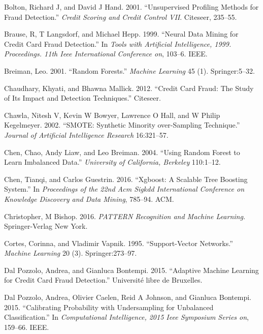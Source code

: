 \documentclass[12pt,]{article}
\begin{document}
\leavevmode\hypertarget{ref-bolton2001unsupervised}{}%
Bolton, Richard J, and David J Hand. 2001. ``Unsupervised Profiling
Methods for Fraud Detection.'' \emph{Credit Scoring and Credit Control
VII}. Citeseer, 235--55.

\leavevmode\hypertarget{ref-brause1999neural}{}%
Brause, R, T Langsdorf, and Michael Hepp. 1999. ``Neural Data Mining for
Credit Card Fraud Detection.'' In \emph{Tools with Artificial
Intelligence, 1999. Proceedings. 11th Ieee International Conference on},
103--6. IEEE.

\leavevmode\hypertarget{ref-breiman2001random}{}%
Breiman, Leo. 2001. ``Random Forests.'' \emph{Machine Learning} 45 (1).
Springer:5--32.

\leavevmode\hypertarget{ref-chaudhary2012credit}{}%
Chaudhary, Khyati, and Bhawna Mallick. 2012. ``Credit Card Fraud: The
Study of Its Impact and Detection Techniques.'' Citeseer.

\leavevmode\hypertarget{ref-chawla2002smote}{}%
Chawla, Nitesh V, Kevin W Bowyer, Lawrence O Hall, and W Philip
Kegelmeyer. 2002. ``SMOTE: Synthetic Minority over-Sampling Technique.''
\emph{Journal of Artificial Intelligence Research} 16:321--57.

\leavevmode\hypertarget{ref-chen2004using}{}%
Chen, Chao, Andy Liaw, and Leo Breiman. 2004. ``Using Random Forest to
Learn Imbalanced Data.'' \emph{University of California, Berkeley}
110:1--12.

\leavevmode\hypertarget{ref-chen2016xgboost}{}%
Chen, Tianqi, and Carlos Guestrin. 2016. ``Xgboost: A Scalable Tree
Boosting System.'' In \emph{Proceedings of the 22nd Acm Sigkdd
International Conference on Knowledge Discovery and Data Mining},
785--94. ACM.

\leavevmode\hypertarget{ref-christopher2016pattern}{}%
Christopher, M Bishop. 2016. \emph{PATTERN Recognition and Machine
Learning.} Springer-Verlag New York.

\leavevmode\hypertarget{ref-cortes1995support}{}%
Cortes, Corinna, and Vladimir Vapnik. 1995. ``Support-Vector Networks.''
\emph{Machine Learning} 20 (3). Springer:273--97.

\leavevmode\hypertarget{ref-dal2015adaptive}{}%
Dal Pozzolo, Andrea, and Gianluca Bontempi. 2015. ``Adaptive Machine
Learning for Credit Card Fraud Detection.'' Université libre de
Bruxelles.

\leavevmode\hypertarget{ref-dal2015calibrating}{}%
Dal Pozzolo, Andrea, Olivier Caelen, Reid A Johnson, and Gianluca
Bontempi. 2015. ``Calibrating Probability with Undersampling for
Unbalanced Classification.'' In \emph{Computational Intelligence, 2015
Ieee Symposium Series on}, 159--66. IEEE.
\end{document}
